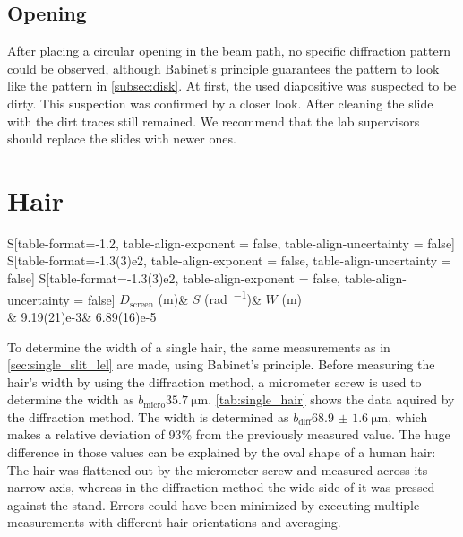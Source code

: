 \subsection*{Opening}
After placing a circular opening in the beam path, no specific diffraction pattern could be observed, although Babinet's principle guarantees the pattern to look like the pattern in \autoref{subsec:disk}.
At first, the used diapositive was suspected to be dirty.
This suspection was confirmed by a closer look.
After cleaning the slide with  the dirt traces still remained.
We recommend that the lab supervisors should replace the slides with newer ones.

\section{Hair}
\begin{table}[b!]
	\centering
	\caption{Single hair width}
	\label{tab:single_hair}
	\begin{tabular}{
	S[table-format=-1.2, table-align-exponent = false, table-align-uncertainty = false]
	S[table-format=-1.3(3)e2, table-align-exponent = false, table-align-uncertainty = false]
	S[table-format=-1.3(3)e2, table-align-exponent = false, table-align-uncertainty = false]
	}
		\toprule
		{$D_\text{screen}$ (\si{\meter})}&	{$S$ (\si{\radian\per\order})}&	{$W$ (\si{\meter})}\\
		&   9.19(21)e-3&    6.89(16)e-5\\
		\bottomrule
	\end{tabular}
\end{table}
To determine the width of a single hair, the same measurements as in \autoref{sec:single_slit_lel} are made, using Babinet's principle.
Before measuring the hair's width by using the diffraction method, a micrometer screw is used to determine the width as $b_\text{micro}\SI{35.7}{\micro\meter}$.
\autoref{tab:single_hair} shows the data aquired by the diffraction method.
The width is determined as $b_\text{diff}\SI{68.9(16)}{\micro\meter}$, which makes a relative deviation of \num{93}\% from the previously measured value.
The huge difference in those values can be explained by the oval shape of a human hair:
The hair was flattened out by the micrometer screw and measured across its narrow axis, whereas in the diffraction method the wide side of it was pressed against the stand.
Errors could have been minimized by executing multiple measurements with different hair orientations and averaging.
